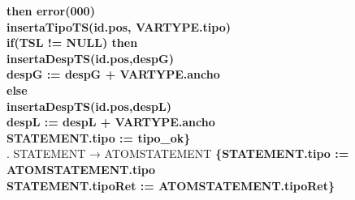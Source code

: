 \begin{tabbing}
    \>\textbf{then error(000)}\\
    \>                    \> \textbf{insertaTipoTS(id.pos, VARTYPE.tipo)}\\
    \>                    \> \textbf{if(TSL != NULL) then }\\
    \>                    \> \> \textbf{insertaDespTS(id.pos,despG)}\\
    \>                    \> \> \textbf{despG := despG + VARTYPE.ancho}\\
    \>                    \> \textbf{else}\\
    \>                    \> \> \textbf{insertaDespTS(id.pos,despL)}\\
    \>                    \> \> \textbf{despL := despL + VARTYPE.ancho}\\
    \>                    \> \textbf{STATEMENT.tipo := tipo\_ok\}}\\
    . STATEMENT → ATOMSTATEMENT \textbf{\{STATEMENT.tipo := ATOMSTATEMENT.tipo}\\
    \>                    \> \textbf{STATEMENT.tipoRet := ATOMSTATEMENT.tipoRet\}}\\


\end{tabbing}
